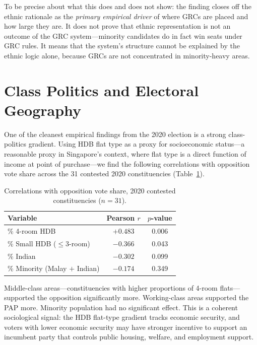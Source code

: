 \documentclass[12pt]{article}
\begin{document}
To be precise about what this does and does not show: the finding closes off the ethnic rationale
as the \textit{primary empirical driver} of where GRCs are placed and how large they are. It does
not prove that ethnic representation is not an outcome of the GRC system---minority candidates do
in fact win seats under GRC rules. It means that the system's structure cannot be explained by the
ethnic logic alone, because GRCs are not concentrated in minority-heavy areas.

\section{Class Politics and Electoral Geography}

One of the cleanest empirical findings from the 2020 election is a strong class-politics gradient.
Using HDB flat type as a proxy for socioeconomic status---a reasonable proxy in Singapore's
context, where flat type is a direct function of income at point of purchase---we find the
following correlations with opposition vote share across the 31 contested 2020 constituencies
(Table~\ref{tab:class}).

\begin{table}[h]
\centering
\caption{Correlations with opposition vote share, 2020 contested constituencies ($n=31$).}
\label{tab:class}
\begin{tabular}{lcc}
\toprule
Variable & Pearson $r$ & $p$-value \\
\midrule
\% 4-room HDB        & $+0.483$ & 0.006 \\
\% Small HDB ($\leq$3-room) & $-0.366$ & 0.043 \\
\% Indian            & $-0.302$ & 0.099 \\
\% Minority (Malay $+$ Indian) & $-0.174$ & 0.349 \\
\bottomrule
\end{tabular}
\end{table}

Middle-class areas---constituencies with higher proportions of 4-room flats---supported the
opposition significantly more. Working-class areas supported the PAP more. Minority population had
no significant effect. This is a coherent sociological signal: the HDB flat-type gradient tracks
economic security, and voters with lower economic security may have stronger incentive to support
an incumbent party that controls public housing, welfare, and employment support.
\end{document}
